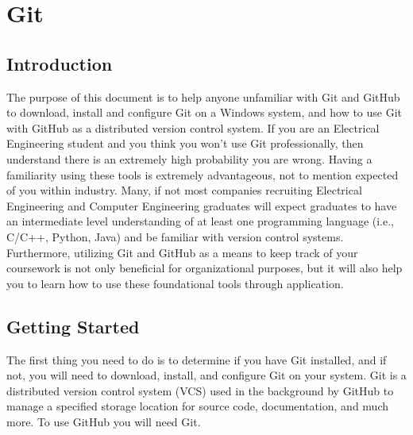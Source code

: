 \documentclass{article}
\begin{document}
\begin{titlepage}
\maketitle
\thispagestyle{empty}
\end{titlepage}

\section*{Git}

\subsection*{Introduction}
The purpose of this document is to help anyone unfamiliar with Git and GitHub to download, install and configure Git on a Windows system, and how to use Git with GitHub as a distributed version control system. If you are an Electrical Engineering student and you think you won't use Git professionally, then understand there is an extremely high probability you are wrong. Having a familiarity using these tools is extremely advantageous, not to mention expected of you within industry. Many, if not most companies recruiting Electrical Engineering and Computer Engineering graduates will expect graduates to have an intermediate level understanding of at least one programming language (i.e., C/C++, Python, Java) and be familiar with version control systems. Furthermore, utilizing Git and GitHub as a means to keep track of your coursework is not only beneficial for organizational purposes, but it will also help you to learn how to use these foundational tools through application.

\subsection*{Getting Started}
The first thing you need to do is to determine if you have Git installed, and if not, you will need to download, install, and configure Git on your system. Git is a distributed version control system (VCS) used in the background by GitHub to manage a specified storage location for source code, documentation, and much more. To use GitHub you will need Git.
\end{document}
